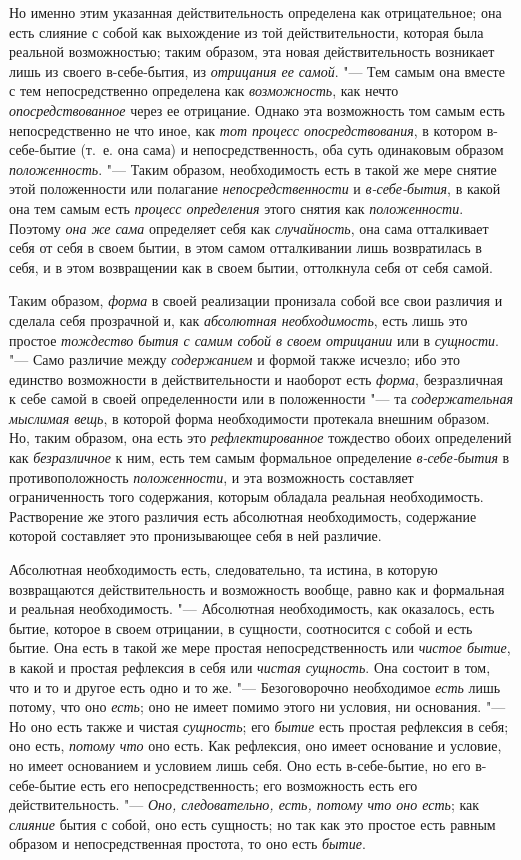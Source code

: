 Но именно этим указанная действительность определена как отрицательное; она
есть слияние с собой как выхождение из той действительности, которая была
реальной возможностью; таким образом, эта новая действительность возникает
лишь из своего в-себе-бытия, из {\em отрицания ее
самой}. "--- Тем самым она вместе с тем непосредственно определена как
{\em возможность}, как нечто
{\em опосредствованное} через ее отрицание. Однако эта
возможность том самым есть непосредственно не что иное, как
{\em тот процесс опосредствования}, в котором
в-себе-бытие (т.~е. она сама) и непосредственность, оба суть одинаковым
образом {\em положенность}. "--- Таким образом,
необходимость есть в такой же мере снятие этой положенности или полагание
{\em непосредственности} и
{\em в-себе-бытия}, в какой она тем самым есть
{\em процесс определения} этого снятия как
{\em положенности}. Поэтому
{\em она же сама} определяет себя как
{\em случайность}, она сама отталкивает себя от себя в
своем бытии, в этом самом отталкивании лишь возвратилась в себя, и в этом
возвращении как в своем бытии, оттолкнула себя от себя самой.

Таким образом, {\em форма} в своей реализации пронизала
собой все свои различия и сделала себя прозрачной и, как
{\em абсолютная необходимость}, есть лишь это простое
{\em тождество бытия с самим собой в своем отрицании}
или в {\em сущности}. "--- Само различие между
{\em содержанием} и формой также исчезло; ибо это
единство возможности в действительности и наоборот есть
{\em форма}, безразличная к себе самой в своей
определенности или в положенности "--- та
{\em содержательная мыслимая вещь}, в которой форма
необходимости протекала внешним образом. Но, таким образом, она есть это
{\em рефлектированное} тождество обоих определений как
{\em безразличное} к ним, есть тем самым формальное
определение {\em в-себе-бытия} в противоположность
{\em положенности}, и эта возможность составляет
ограниченность того содержания, которым обладала реальная необходимость.
Растворение же этого различия есть абсолютная необходимость, содержание
которой составляет это пронизывающее себя в ней различие.

Абсолютная необходимость есть, следовательно, та истина, в которую
возвращаются действительность и возможность вообще, равно как и формальная
и реальная необходимость. "--- Абсолютная необходимость, как оказалось, есть
бытие, которое в своем отрицании, в сущности, соотносится с собой и есть
бытие. Она есть в такой же мере простая непосредственность или
{\em чистое бытие}, в какой и простая рефлексия в себя
или {\em чистая сущность}. Она состоит в том, что и то
и другое есть одно и то же. "--- Безоговорочно необходимое
{\em есть} лишь потому, что оно
{\em есть}; оно не имеет помимо этого ни условия, ни
основания. "--- Но оно есть также и чистая {\em сущность};
его {\em бытие} есть простая рефлексия в себя; оно
есть, {\em потому что} оно есть. Как рефлексия, оно
имеет основание и условие, но имеет основанием и условием лишь себя. Оно
есть в-себе-бытие, но его в-себе-бытие есть его непосредственность; его
возможность есть его действительность. "--- {\em Оно,
следовательно, есть, потому что оно есть}; как
{\em слияние} бытия с собой, оно есть сущность; но так
как это простое есть равным образом и непосредственная простота, то оно
есть {\em бытие}.

